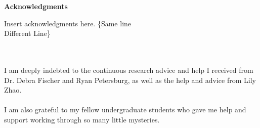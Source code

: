 \begin{center}
{\bf \large Acknowledgments}
\end{center}
Insert acknowledgments here.
\{Same line\\Different Line\}

\\\\
I am deeply indebted to the continuous research advice and help I received from Dr. Debra Fischer and Ryan Petersburg, as well as the help and advice from Lily Zhao.
\\ \\
I am also grateful to my fellow undergraduate students who gave me help and support working through so many little mysteries.
